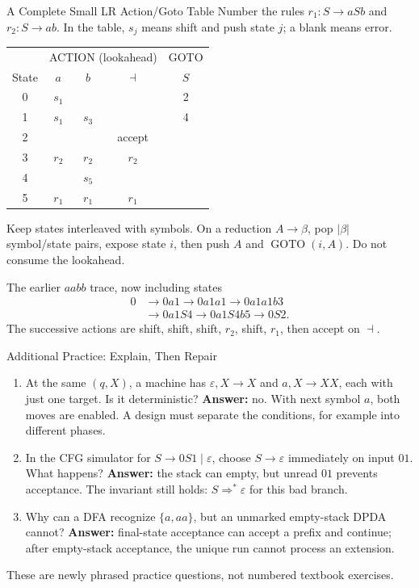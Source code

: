 \documentclass[10pt]{beamer}
\begin{document}
\begin{frame}{A Complete Small LR Action/Goto Table}
  \small
  Number the rules $r_1:S\to aSb$ and $r_2:S\to ab$.
  In the table, $s_j$ means shift and push state $j$; a blank means error.
  \begin{center}
  \begin{tabular}{c|ccc|c}
    \toprule
    & \multicolumn{3}{c|}{ACTION (lookahead)} & GOTO \\
    State & $a$ & $b$ & $\dashv$ & $S$ \\
    \midrule
    0 & $s_1$ & & & 2 \\
    1 & $s_1$ & $s_3$ & & 4 \\
    2 & & & accept & \\
    3 & $r_2$ & $r_2$ & $r_2$ & \\
    4 & & $s_5$ & & \\
    5 & $r_1$ & $r_1$ & $r_1$ & \\
    \bottomrule
  \end{tabular}
  \end{center}
  \pause
  Keep states interleaved with symbols. On a reduction $A\to\beta$, pop
  $|\beta|$ symbol/state pairs, expose state $i$, then push
  $A$ and $\operatorname{GOTO}(i,A)$. Do not consume the lookahead.
  \pause
  \begin{block}{The earlier $aabb$ trace, now including states}
    \[
      \begin{aligned}
        0&\to0a1\to0a1a1\to0a1a1b3\\
         &\to0a1S4\to0a1S4b5\to0S2.
      \end{aligned}
    \]
    The successive actions are shift, shift, shift, $r_2$, shift, $r_1$,
    then accept on $\dashv$.
  \end{block}
\end{frame}

\begin{frame}{Additional Practice: Explain, Then Repair}
  \small
  \begin{enumerate}
    \item At the same $(q,X)$, a machine has $\varepsilon,X\to X$ and
      $a,X\to XX$, each with just one target. Is it deterministic?
    \pause
    \textbf{Answer:} no. With next symbol $a$, both moves are enabled.
    A design must separate the conditions, for example into different phases.
    \pause
    \item In the CFG simulator for $S\to0S1\mid\varepsilon$, choose
      $S\to\varepsilon$ immediately on input $01$. What happens?
    \pause
    \textbf{Answer:} the stack can empty, but unread $01$ prevents acceptance.
    The invariant still holds: $S\Rightarrow^*\varepsilon$ for this bad branch.
    \pause
    \item Why can a DFA recognize $\{a,aa\}$, but an unmarked empty-stack
      DPDA cannot?
    \pause
    \textbf{Answer:} final-state acceptance can accept a prefix and continue;
    after empty-stack acceptance, the unique run cannot process an extension.
  \end{enumerate}
  These are newly phrased practice questions, not numbered textbook exercises.
\end{frame}
\end{document}
